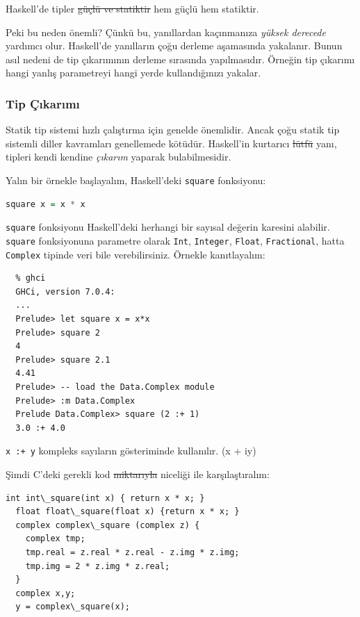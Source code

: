 \documentclass[a4paper,14pt,openany]{extbook} %
\let\emph\textit
\begin{document}
Haskell'de tipler \st{güçlü ve statiktir} hem güçlü hem statiktir.

Peki bu neden önemli? Çünkü bu, yanıllardan kaçınmanıza \emph{yüksek
  derecede} yardımcı olur. Haskell'de yanılların çoğu derleme
aşamasında yakalanır. Bunun asıl nedeni de tip çıkarımının derleme
sırasında yapılmasıdır. Örneğin tip çıkarımı hangi yanlış parametreyi
hangi yerde kullandığınızı yakalar.

\subsubsection{Tip Çıkarımı}\label{tip-uxe7ux131karux131mux131}

Statik tip sistemi hızlı çalıştırma için genelde önemlidir. Ancak çoğu
statik tip sistemli diller kavramları genellemede kötüdür. Haskell'in
kurtarıcı \st{lütfü} yanı, tipleri kendi kendine \emph{çıkarım} yaparak
bulabilmesidir.

Yalın bir örnekle başlayalım, Haskell'deki \lstinline!square!
fonksiyonu:

\begin{lstlisting}[language=Haskell]
  square x = x * x
\end{lstlisting}

\lstinline!square! fonksiyonu Haskell'deki herhangi bir sayısal değerin
karesini alabilir. \lstinline!square! fonksiyonuna parametre olarak
\lstinline!Int!, \lstinline!Integer!, \lstinline!Float!,
\lstinline!Fractional!, hatta \lstinline!Complex! tipinde veri bile
verebilirsiniz. Örnekle kanıtlayalım:

\begin{lstlisting}
  % ghci
  GHCi, version 7.0.4:
  ...
  Prelude> let square x = x*x
  Prelude> square 2
  4
  Prelude> square 2.1
  4.41
  Prelude> -- load the Data.Complex module
  Prelude> :m Data.Complex
  Prelude Data.Complex> square (2 :+ 1)
  3.0 :+ 4.0
\end{lstlisting}

\lstinline!x :+ y! kompleks sayıların gösteriminde kullanılır. (x + iy)

Şimdi C'deki gerekli kod \st{miktarıyla} niceliği ile karşılaştıralım:

\begin{lstlisting}[language= {[ANSI]C},tabsize=2,escapeinside=||]
  int int\_square(int x) { return x * x; }
  float float\_square(float x) {return x * x; }
  complex complex\_square (complex z) {
    complex tmp;
    tmp.real = z.real * z.real - z.img * z.img;
    tmp.img = 2 * z.img * z.real;
  }
  complex x,y;
  y = complex\_square(x);
\end{lstlisting}
\end{document}
